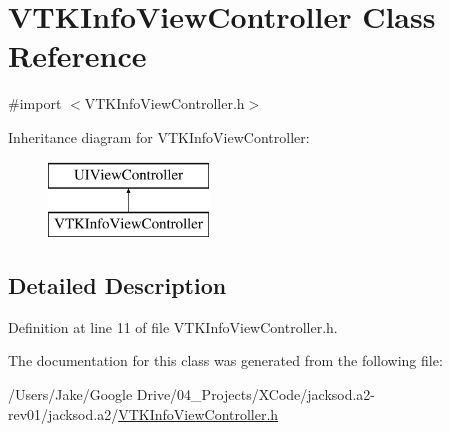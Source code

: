 \hypertarget{interface_v_t_k_info_view_controller}{\section{V\+T\+K\+Info\+View\+Controller Class Reference}
\label{interface_v_t_k_info_view_controller}
}


{\ttfamily \#import $<$V\+T\+K\+Info\+View\+Controller.\+h$>$}

Inheritance diagram for V\+T\+K\+Info\+View\+Controller\+:\begin{figure}[H]
\begin{center}
\leavevmode
\includegraphics[height=2.000000cm]{interface_v_t_k_info_view_controller}
\end{center}
\end{figure}


\subsection{Detailed Description}


Definition at line 11 of file V\+T\+K\+Info\+View\+Controller.\+h.



The documentation for this class was generated from the following file\+:\begin{DoxyCompactItemize}
\item 
/\+Users/\+Jake/\+Google Drive/04\+\_\+\+Projects/\+X\+Code/jacksod.\+a2-\/rev01/jacksod.\+a2/\hyperlink{_v_t_k_info_view_controller_8h}{V\+T\+K\+Info\+View\+Controller.\+h}\end{DoxyCompactItemize}
